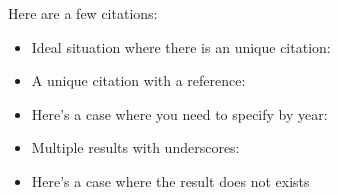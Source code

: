 \documentclass{article}
\begin{document}
Here are a few citations:
\begin{itemize}
    \item
        Ideal situation where there is an unique citation: \cite{mazur:eisenstein}
    \item
        A unique citation with a reference: \cite[Prop. 14.2]{mazur:eisenstein}
    \item
        Here's a case where you need to specify by year:
        \cite{mazur:modular:2000}
    \item
        Multiple results with underscores:
        \cite{ribet:galois_real_multiplication}
    \item
        Here's a case where the result does not exists
        \cite{fermat:marvelous_proof}
\end{itemize}
    


\end{document}
